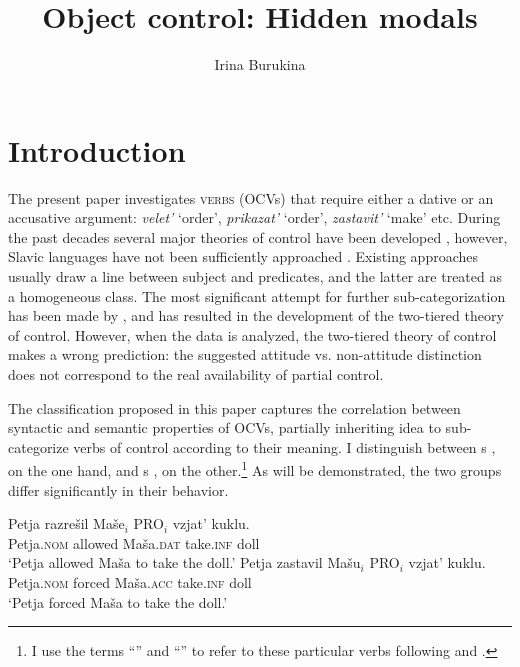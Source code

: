 \documentclass[output=paper,colorlinks,citecolor=brown,newtxmath]{langsci/langscibook}
\title{Object control: Hidden modals}
\author{Irina Burukina\affiliation{Eötvös Loránd University}}
\begin{document}
\maketitle
{}
\section{Introduction}\label{s1}

\sloppy The present paper investigates  \textsc{ verbs} (OCVs) that require either a {dative} or an {accusative argument}: \textit{velet’} `order’, \textit{prikazat’} `order’, \textit{zastavit’} `make’ etc.  During the past decades several major theories of control have been developed \citep{W2001, Boeckx2010, Landau2015}, however, Slavic languages have not been sufficiently approached \citep{FranksHornstein1992, Babby1998}. Existing approaches usually draw a line between subject and  predicates, and the latter are treated as a homogeneous class. The most significant attempt for further sub-categorization has been made by \cite{Landau2015}, and has resulted in the development of the two-tiered theory of control. However, when the  data is analyzed, the two-tiered theory of control makes a wrong prediction: the suggested attitude vs. non-attitude distinction does not correspond to the real availability of partial control. \par

The classification proposed in this paper captures the correlation between syntactic and semantic properties of  OCVs, partially inheriting \cite{JC2003} idea to sub-categorize verbs of control according to their meaning. I distinguish between  s , on the one hand, and  s , on the other.\footnote{I use the terms ``'' and ``'' to refer to these particular verbs following \cite{W2001} and \cite{Landau2013}.} As will be demonstrated, the two groups differ significantly in their behavior.

\begin{exe}
\ex\label{ex1} \begin{xlist}
\ex\label{ex1a}
\gll Petja razrešil Maše$_i$ PRO$_i$ vzjat’ kuklu.\\
    Petja.\textsc{nom} allowed Maša.\textsc{dat} {} take.\textsc{inf} doll \\
\glt `Petja allowed Maša to take the doll.'
\ex\label{ex1b}
\gll Petja zastavil Mašu$_i$ PRO$_i$ vzjat’ kuklu.\\
    Petja.\textsc{nom} forced Maša.\textsc{acc} {} take.\textsc{inf} doll \\
\glt `Petja forced Maša to take the doll.'
    \end{xlist}
\end{exe}
\end{document}
